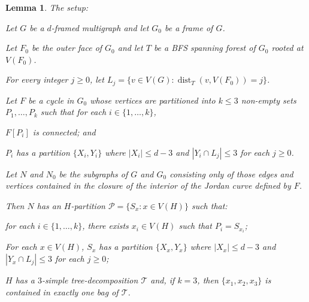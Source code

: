 \documentclass{patmorin}
\theoremstyle{plain}
\newtheorem{lem}[thm]{Lemma}
\theoremstyle{definition}
\DeclareMathOperator{\dist}{dist}
\newcommand{\PP}{\mathcal{P}}
\renewcommand{\ge}{\geqslant}
\renewcommand{\le}{\leqslant}
\begin{document}
\begin{lem}
  \label{induction} The setup:
  \begin{compactenum}
    \item Let $G$ be a $d$-framed multigraph and let $G_0$ be a frame of $G$.
    \item Let $F_0$ be the outer face of $G_0$ and let $T$ be a BFS spanning forest of $G_0$ rooted at $V(F_0)$.
    \item For every integer $j\ge 0$, let $L_j=\{v\in V(G):\dist_T(v,V(F_0))=j\}$.
    \item Let $F$ be a cycle in $G_0$ whose vertices are partitioned into $k\le 3$ non-empty sets $P_1,\ldots,P_k$ such that for each $i\in\{1,\ldots,k\}$,
    \begin{compactenum}
      \item $F[P_i]$ is connected; and
      \item $P_i$ has a partition $\{X_i,Y_i\}$ where $|X_i|\le d-3$ and $|Y_i\cap L_j| \le 3$ for each $j\ge 0$.
    \end{compactenum}
    \item Let $N$ and $N_0$ be the subgraphs of $G$ and $G_0$ consisting only of those edges and vertices contained in the closure of the interior of the Jordan curve defined by $F$.
  \end{compactenum}
  Then $N$ has an $H$-partition $\PP=\{S_x: x\in V(H)\}$ such that:
  \begin{compactenum}[(i)]
    \item for each $i\in\{1,\ldots,k\}$, there exists $x_i\in V(H)$ such that $P_i=S_{x_i}$;
    \item For each $x\in V(H)$, $S_x$ has a partition $\{X_x,Y_x\}$ where $|X_x|\le d-3$ and $|Y_x\cap L_j|\le 3$ for each $j\ge 0$;
    \item $H$ has a $3$-simple tree-decomposition $\mathcal{T}$ and, if $k=3$, then $\{x_1,x_2,x_3\}$ is contained in exactly one bag of $\mathcal{T}$.
  \end{compactenum}
\end{lem}
\end{document}
